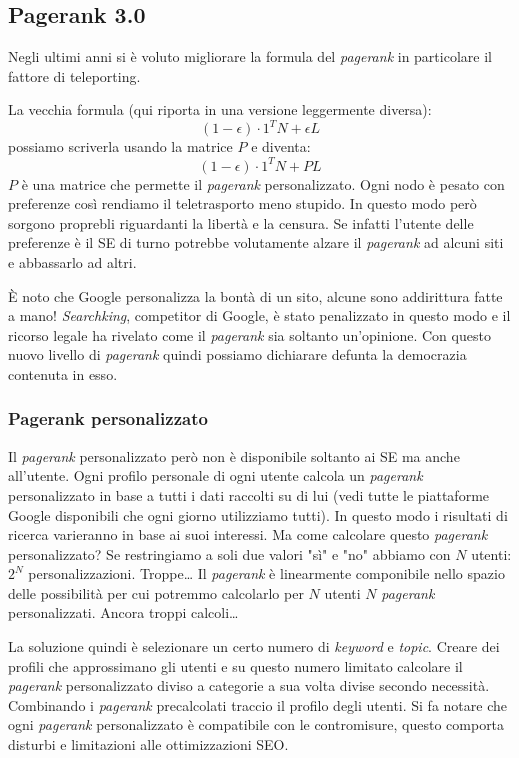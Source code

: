 		\subsection{Pagerank 3.0}
			Negli ultimi anni si è voluto migliorare la formula del \emph{pagerank} in particolare il fattore di teleporting.
			
			La vecchia formula (qui riporta in una versione leggermente diversa):
			\[
				(1-\epsilon )\cdot 1^T N + \epsilon L
			\]
			possiamo scriverla usando la matrice $P$ e diventa:
			\[
				(1- \epsilon )\cdot 1^T N + PL
			\]
			$P$ è una matrice che permette il \emph{pagerank} personalizzato. Ogni nodo è pesato con preferenze così rendiamo il teletrasporto meno stupido. In questo modo però sorgono proprebli riguardanti la libertà e la censura. Se infatti l'utente delle preferenze è il SE di turno potrebbe volutamente alzare il \emph{pagerank} ad alcuni siti e abbassarlo ad altri. 
			
			È noto che Google personalizza la bontà di un sito, alcune sono addirittura fatte a mano! \emph{Searchking}, competitor di Google, è stato penalizzato in questo modo e il ricorso legale ha rivelato come il \emph{pagerank} sia soltanto un'opinione.
			Con questo nuovo livello di \emph{pagerank} quindi possiamo dichiarare defunta la democrazia contenuta in esso.
		
			\subsubsection{Pagerank personalizzato}
			
				Il \emph{pagerank} personalizzato però non è disponibile soltanto ai SE ma anche all'utente. Ogni profilo personale di ogni utente calcola un \emph{pagerank} personalizzato in base a tutti i dati raccolti su di lui (vedi tutte le piattaforme Google disponibili che ogni giorno utilizziamo tutti).  In questo modo i risultati di ricerca varieranno in base ai suoi interessi.
				Ma come calcolare questo \emph{pagerank} personalizzato? Se restringiamo a soli due valori "sì" e "no" abbiamo con $N$ utenti: $2^N$ personalizzazioni. Troppe\dots
				Il \emph{pagerank} è linearmente componibile nello spazio delle possibilità per cui potremmo calcolarlo per $N$ utenti $N$ \emph{pagerank} personalizzati. Ancora troppi calcoli\dots
				
				La soluzione quindi è selezionare un certo numero di \emph{keyword} e \emph{topic}. Creare dei profili che approssimano gli utenti e su questo numero limitato calcolare il \emph{pagerank} personalizzato diviso a categorie a sua volta divise secondo necessità. Combinando i \emph{pagerank} precalcolati traccio il profilo degli utenti. Si fa notare che ogni \emph{pagerank} personalizzato è compatibile con le contromisure, questo comporta disturbi e limitazioni alle ottimizzazioni SEO.
			
